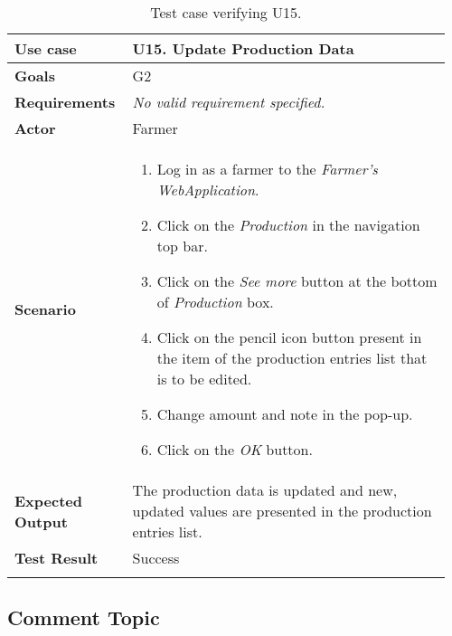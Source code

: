 \begin{longtable}{@{}p{0.25\linewidth}p{0.71\linewidth}@{}}
	\toprule
	\textbf{Use case} & \textbf{U15.} Update Production Data \\
	\midrule
	\textbf{Goals} & G2\\
	\midrule
	\textbf{Requirements} & \textit{No valid requirement specified.}\\
	\midrule
	\textbf{Actor} & Farmer\\
	\midrule
	\textbf{Scenario} & \begin{enumerate}[leftmargin=.4cm,noitemsep,topsep=0pt,before=\vspace{-3mm},after=\vspace{-4mm}]
		\item Log in as a farmer to the \textit{Farmer's WebApplication}.
		\item Click on the \textit{Production} in the navigation top bar.
		\item Click on the \textit{See more} button at the bottom of \textit{Production} box.
		\item Click on the pencil icon button present in the item of the production entries list that is to be edited.
		\item Change amount and note in the pop-up.
		\item Click on the \textit{OK} button.
	\end{enumerate}\\
	\midrule
	\textbf{Expected Output} & The production data is updated and new, updated values are presented in the production entries list.\\
	\midrule
	\textbf{Test Result} & Success\\
	\bottomrule
	\caption{Test case verifying U15.}
\end{longtable}

\subsection{Comment Topic}


